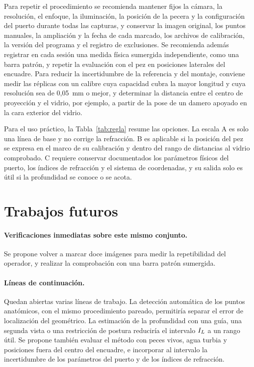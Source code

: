 Para repetir el procedimiento se recomienda mantener fijos la cámara, la resolución, el enfoque, la iluminación, la posición de la pecera y la configuración del puerto durante todas las capturas, y conservar la imagen original, los puntos manuales, la ampliación y la fecha de cada marcado, los archivos de calibración, la versión del programa y el registro de exclusiones. Se recomienda además registrar en cada sesión una medida física sumergida independiente, como una barra patrón, y repetir la evaluación con el pez en posiciones laterales del encuadre. Para reducir la incertidumbre de la referencia y del montaje, conviene medir las réplicas con un calibre cuya capacidad cubra la mayor longitud y cuya resolución sea de 0,05~mm o mejor, y determinar la distancia entre el centro de proyección y el vidrio, por ejemplo, a partir de la pose de un damero apoyado en la cara exterior del vidrio.

Para el uso práctico, la Tabla~\ref{tab:regla} resume las opciones. La escala A es solo una línea de base y no corrige la refracción. B es aplicable si la posición del pez se expresa en el marco de su calibración y dentro del rango de distancias al vidrio comprobado. C requiere conservar documentados los parámetros físicos del puerto, los índices de refracción y el sistema de coordenadas, y su salida solo es útil si la profundidad se conoce o se acota.

\section{Trabajos futuros}

\paragraph{Verificaciones inmediatas sobre este mismo conjunto.} Se propone volver a marcar doce imágenes para medir la repetibilidad del operador, y realizar la comprobación con una barra patrón sumergida.

\paragraph{Líneas de continuación.} Quedan abiertas varias líneas de trabajo. La detección automática de los puntos anatómicos, con el mismo procedimiento pareado, permitiría separar el error de localización del geométrico. La estimación de la profundidad con una guía, una segunda vista o una restricción de postura reduciría el intervalo $I_L$ a un rango útil. Se propone también evaluar el método con peces vivos, agua turbia y posiciones fuera del centro del encuadre, e incorporar al intervalo la incertidumbre de los parámetros del puerto y de los índices de refracción.
